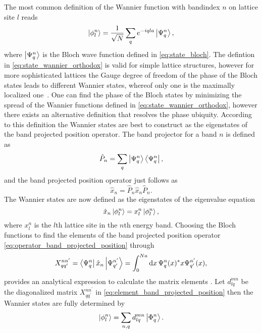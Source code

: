 The most common definition of the Wannier function with bandindex $n$ on
lattice site $l$ reads
\begin{equation}
  \ket{\phi^n_{l}}
  =\frac{1}{\sqrt{N}}\sum_qe^{-iqla}\ket{\Psi^n_{q}}
  \label{eq:state_wannier_orthodox},
\end{equation}
where $\ket{\Psi^n_q}$ is the Bloch wave function defined in
\cref{eq:state_bloch}. The defintion in \cref{eq:state_wannier_orthodox} is
valid for simple lattice structures, however for more sophisticated lattices
the Gauge degree of freedom of the phase of the Bloch states leads to
different Wannier states, whereof only one is the maximally localized
one~\cite{Goerg2014}. One can find the phase of the Bloch states by minimizing
the spread of the Wannier functions defined in
\cref{eq:state_wannier_orthodox}, however there exists an alternative
definition that resolves the phase ubiquity. According to this definition the
Wannier states are best to construct as the eigenstates of the band projected
position operator. The band projector for a band $n$ is defined as
\begin{equation}
  \hat{P}_n
  =\sum_q\ket{\Psi^n_q}\bra{\Psi^n_q}
  \label{eq:operator_band_projector},
\end{equation}
and the band projected position operator just follows as
\begin{equation}
  \hat{x}_n
  =\hat{P}_n\hat{x}_n\hat{P}_n
  \label{eq:operator_band_projected_position}.
\end{equation}
The Wannier states are now defined as the eigenstates of the eigenvalue
equation
\begin{equation}
  \hat{x}_n\ket{\phi^n_l}=x^n_l\ket{\phi^n_l}
  \label{eq:eigenvalue_band_projected_position},
\end{equation}
where $x^n_l$ is the $l$th lattice site in the $n$th energy band. Choosing
the Bloch functions to find the elements of the band projected position
operator \cref{eq:operator_band_projected_position} through
\begin{equation}
  X^{nn^\prime}_{qq^\prime}
  =\bra{\Psi^n_q}\hat{x}_n\ket{\Psi^{n^\prime}_{q^\prime}}
  =\int_0^{Na}\dd{x}\Psi^n_q(x)^*x\Psi^{n^\prime}_{q^\prime}(x)
  \label{eq:element_band_projected_position},
\end{equation}
provides an analytical expression to calculate the matrix elements
\cite{Bissbort2013}. Let $d^{mn}_{lq}$ be the diagonalized
matrix $X^{nn^\prime}_{qq^\prime}$ in
\cref{eq:element_band_projected_position} then the Wannier states are fully
determined by
\begin{equation}
  \ket{\phi^n_l}
  =\sum_{n,q}d^{mn}_{lq}\ket{\Phi^n_q}
  \label{eq:state_wannier}.
\end{equation}

